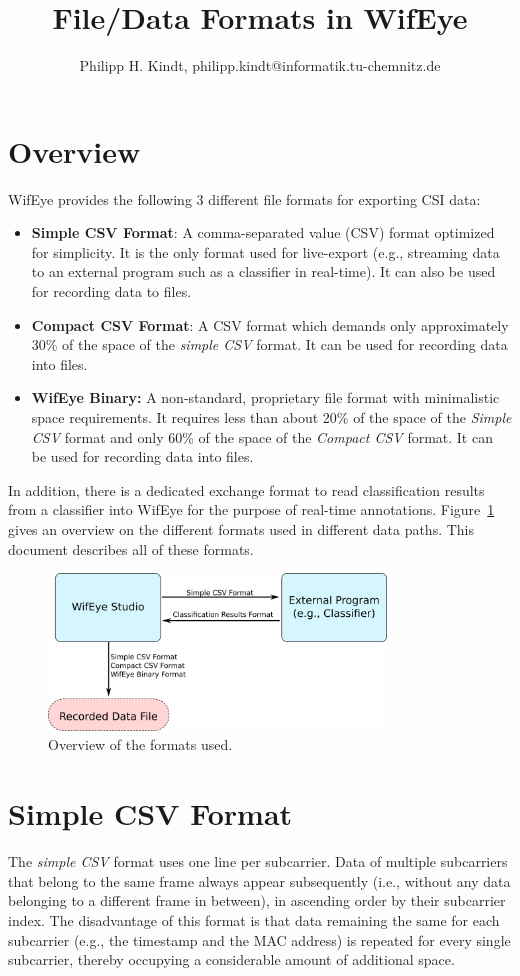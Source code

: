 \documentclass{article}
\title{File/Data Formats in WifEye}
\author{Philipp H. Kindt, philipp.kindt@informatik.tu-chemnitz.de}
\begin{document}
\maketitle
	\section{Overview}
WifEye provides the following 3 different file formats for exporting CSI data:
\begin{itemize}
	\item \textbf{Simple CSV Format}: A comma-separated value (CSV) format optimized for simplicity. It is the only format used for live-export (e.g., streaming data to an external program such as a classifier in real-time). It can also be used for recording data to files.
	\item \textbf{Compact CSV Format}: A CSV format which demands only approximately 30\% of the space of the \textit{simple CSV} format. It can be used for recording data into files.
	\item \textbf{WifEye Binary:} A non-standard, proprietary file format with minimalistic space requirements. It requires less than about 20\% of the space of the \textit{Simple CSV} format and only 60\% of the space of the \textit{Compact CSV} format. It can be used for recording data into files. 
\end{itemize}
In addition, there is a dedicated exchange format to read classification results from a classifier into WifEye for the purpose of real-time annotations. Figure~\ref{fig:formatOverview} gives an overview on the different formats used in different data paths. This document describes all of these formats.
\begin{figure}
	\centering
	\vspace*{-.5cm}
	\includegraphics[width=0.8\textwidth]{images/formatOverview.png}
	\caption{Overview of the formats used.}
	\label{fig:formatOverview}
\end{figure}
\section{Simple CSV Format}
The \textit{simple CSV} format uses one line per subcarrier. Data of multiple subcarriers that belong to the same frame always appear subsequently (i.e., without any data belonging to a different frame in between), in ascending order by their subcarrier index. The disadvantage of this format is that data remaining the same for each subcarrier (e.g., the timestamp and the MAC address) is repeated for every single subcarrier, thereby occupying a considerable amount of additional space.
\end{document}
